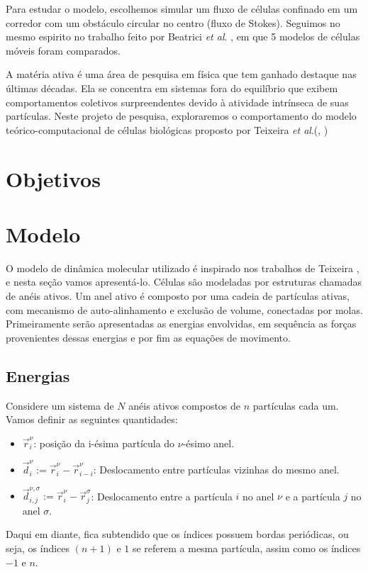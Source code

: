 \documentclass{article}
\theoremstyle{definition}
\def \quantity#1#2#3{\vec{#1}_{#2}^{#3}}
\def \quantityg#1#2#3#4#5{\vec{#1}_{#2, #3}^{#4, #5}}
\def \pos#1#2{\quantity{r}{#1}{#2}}
\def \desloc#1#2{\quantity{d}{#1}{#2}}
\begin{document}
Para estudar o modelo, escolhemos simular um fluxo de células confinado em um corredor com um obstáculo circular no centro (fluxo de Stokes). 
Seguimos no mesmo espirito no trabalho feito por Beatrici \textit{et al}. \cite{beatrici_comparing_2023}, em que 5 modelos de células móveis foram comparados.


A matéria ativa é uma área de pesquisa em física que tem ganhado destaque nas últimas décadas. Ela se concentra em sistemas fora do equilíbrio que exibem comportamentos coletivos surpreendentes devido à atividade intrínseca de suas partículas. Neste projeto de pesquisa, exploraremos o comportamento do modelo teórico-computacional de células biológicas proposto por Teixeira \textit{et al}.(\cite{teixeira_single_2021}, \cite{teixeira_segregation_2024})



\section{Objetivos}

\section{Modelo}
O modelo de dinâmica molecular utilizado é inspirado nos trabalhos de Teixeira \cite{teixeira_single_2021}, \cite{teixeira_segregation_2024} e nesta seção vamos apresentá-lo. Células são modeladas por estruturas chamadas de anéis ativos. Um anel ativo é composto por uma cadeia de partículas ativas, com mecanismo de auto-alinhamento e exclusão de volume, conectadas por molas. Primeiramente serão apresentadas as energias envolvidas, em sequência as forças provenientes dessas energias e por fim as equações de movimento.

\subsection{Energias}
Considere um sistema de $N$ anéis ativos compostos de $n$ partículas cada um. Vamos definir as seguintes quantidades:

\begin{itemize}
    \item $\pos{i}{\nu}$: posição da i-ésima partícula do $\nu$-ésimo anel.
    \item $\desloc{i}{\nu} := \pos{i}{\nu} - \pos{i-i}{\nu}$: Deslocamento entre partículas vizinhas do mesmo anel.
    \item $\quantityg{d}{i}{j}{\nu}{\sigma} := \pos{i}{\nu} - \pos{j}{\sigma}$: Deslocamento entre a partícula $i$ no anel $\nu$ e a partícula $j$ no anel $\sigma$.
\end{itemize}
Daqui em diante, fica subtendido que os índices possuem bordas periódicas, ou seja, os índices $(n+1)$ e $1$ se referem a mesma partícula, assim como os índices $-1$ e $n$.
\end{document}
